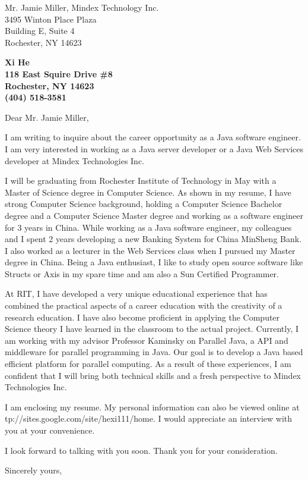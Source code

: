 \documentclass[10pt]{letter} %
\makeatletter
\newcommand*\wrapletters[1]{\wr@pletters#1\@nil}
\def\wr@pletters#1#2\@nil{#1\allowbreak\if&#2&\else\wr@pletters#2\@nil\fi}
\makeatother
\begin{document}
\signature{Xi He}                  %
\longindentation=0pt                       %
\let\raggedleft\raggedright                %
 
\begin{letter}{Mr. Jamie Miller, Mindex Technology Inc.  \\
3495 Winton Place Plaza \\
Building E, Suite 4  \\
Rochester, NY 14623 } 

\begin{center}
\large\bf Xi He\\
118 East Squire Drive \#8\\ Rochester, NY 14623 \\ (404) 518-3581
\end{center} 
\vfill %


 
\opening{Dear Mr. Jamie Miller,} 
 
\noindent I am writing to inquire about the career opportunity as a Java software engineer.
I am very interested in working as a Java server developer or a Java Web Services developer at Mindex Technologies Inc. 
 
\noindent I will be graduating from Rochester Institute of Technology in May with a Master of Science degree in Computer Science. As shown in my resume, I have strong Computer Science background, holding a Computer Science Bachelor degree and a Computer Science Master degree and working as a software engineer for 3 years in China. While working as a Java software engineer, my colleagues and I spent 2 years developing a new Banking System for China MinSheng Bank.  I also worked as a lecturer in the Web Services class when I pursued my Master degree in China. Being a Java enthusiast, I like to study open source software like Structs or Axis in my spare time and am also a Sun Certified Programmer. 

At RIT, I have developed a very unique educational experience that has combined the practical aspects of a career education with the creativity of a research education. I have also become proficient in applying the Computer Science theory I have learned in the classroom to the actual project. Currently, I am working with my advisor Professor Kaminsky on Parallel Java, a API and middleware for parallel programming in Java. Our goal is to develop a Java based efficient platform for parallel computing. As a result of these experiences, I am confident that I will bring both technical skills and a fresh perspective to Mindex Technologies Inc.
 
\noindent I am enclosing my resume. My personal information can also be viewed online at \wrapletters{http://sites.google.com/site/hexi111/home}.
I would appreciate an interview with you at your convenience. 

I look forward to talking with you soon. Thank you for your consideration.
 
\closing{Sincerely yours,}
 
 
\encl{}  				%

\end{letter}
 
\end{document}
